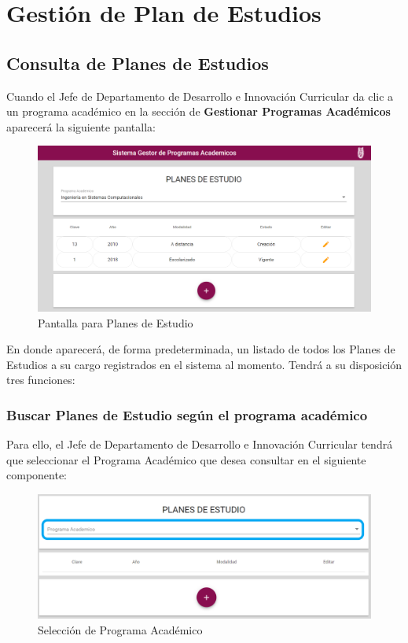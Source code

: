 
\section{Gestión de Plan de Estudios}
\subsection{Consulta de Planes de Estudios}
Cuando el Jefe de Departamento de Desarrollo e Innovación Curricular da clic a un programa académico en la sección de \textbf{Gestionar Programas Académicos} aparecerá la siguiente pantalla:


\begin{figure}[!hbtp]
	\centering
	\hypertarget{consultarPE}{\includegraphics[width=0.7\linewidth]{images/SP4-GPE/consultar}}
	\caption{Pantalla para Planes de Estudio}
	\label{consultarPE}
\end{figure}

En donde aparecerá, de forma predeterminada, un listado de todos los Planes de Estudios a su cargo registrados en el sistema al momento. Tendrá a su disposición tres funciones:

\subsubsection{Buscar Planes de Estudio según el programa académico}

Para ello, el Jefe de Departamento de Desarrollo e Innovación Curricular tendrá que seleccionar el Programa Académico que desea consultar en el siguiente componente:

\begin{figure}[!hbtp]
	\centering
	\hypertarget{academico}{\includegraphics[width=0.7\linewidth]{images/SP4-GPE/programa}}
	\caption{Selección de Programa Académico}
	\label{academico}
\end{figure}

